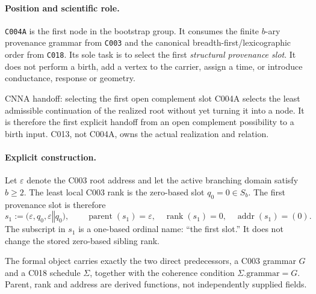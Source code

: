 
\paragraph*{Position and scientific role.}
\texttt{C004A} is the first node in the bootstrap group.  It consumes the
finite $b$-ary provenance grammar from \texttt{C003} and the canonical
breadth-first/lexicographic order from \texttt{C018}.  Its sole task is to
select the first \emph{structural provenance slot}.  It does not perform a
birth, add a vertex to the carrier, assign a time, or introduce conductance,
response or geometry.

\begin{cnnaInfoBox}{CNNA handoff: selecting the first open complement slot}
C004A selects the least admissible continuation of the realized root without yet turning it into a node.  It is therefore the first explicit handoff from an open complement possibility to a birth input.  C013, not C004A, owns the actual realization and relation.
\end{cnnaInfoBox}

\paragraph*{Explicit construction.}
Let $\varepsilon$ denote the C003 root address and let the active branching
domain satisfy $b\ge2$.  The least local C003 rank is the zero-based slot
$q_0=0\in S_b$.  The first provenance slot is therefore
\begin{equation}
  s_1:=\bigl(\varepsilon,q_0,\varepsilon\mathbin{\Vert}q_0\bigr),
  \qquad
  \operatorname{parent}(s_1)=\varepsilon,
  \quad
  \operatorname{rank}(s_1)=0,
  \quad
  \operatorname{addr}(s_1)=(0).
  \label{eq:c004a-first-slot-construction}
\end{equation}
The subscript in $s_1$ is a one-based ordinal name: ``the first slot.''  It
does not change the stored zero-based sibling rank.

The formal object carries exactly the two direct predecessors, a C003 grammar
$G$ and a C018 schedule $\Sigma$, together with the coherence condition
$\Sigma.\mathrm{grammar}=G$.  Parent, rank and address are derived functions,
not independently supplied fields.

